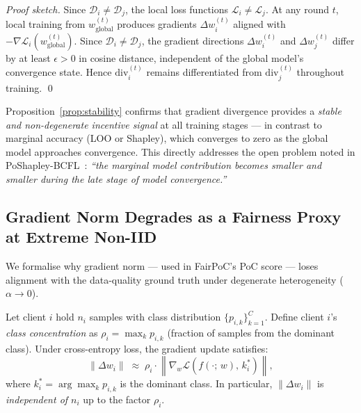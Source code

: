\begin{proof}[Proof sketch]
Since $\mathcal{D}_i \neq \mathcal{D}_j$, the local loss
functions $\mathcal{L}_i \neq \mathcal{L}_j$.
At any round $t$, local training from $w_{\mathrm{global}}^{(t)}$
produces gradients $\Delta w_i^{(t)}$ aligned with
$-\nabla \mathcal{L}_i(w_{\mathrm{global}}^{(t)})$.
Since $\mathcal{D}_i \neq \mathcal{D}_j$, the gradient directions
$\Delta w_i^{(t)}$ and $\Delta w_j^{(t)}$ differ by at least
$\epsilon > 0$ in cosine distance, independent of the global model's
convergence state.
Hence $\mathrm{div}_i^{(t)}$ remains differentiated from
$\mathrm{div}_j^{(t)}$ throughout training. \qed
\end{proof}

\begin{remark}
Proposition~\ref{prop:stability} confirms that gradient divergence
provides a \emph{stable and non-degenerate incentive signal}
at all training stages — in contrast to marginal accuracy
(LOO or Shapley), which converges to zero as the global model
approaches convergence.
This directly addresses the open problem noted in
PoShapley-BCFL~\cite{poshapley2023}: \emph{``the marginal model
contribution becomes smaller and smaller during the late stage
of model convergence.''}
\end{remark}

\subsection{Gradient Norm Degrades as a Fairness Proxy at Extreme Non-IID}

We formalise why gradient norm — used in FairPoC's PoC score —
loses alignment with the data-quality ground truth under
degenerate heterogeneity ($\alpha \to 0$).

\begin{proposition}
\label{prop:gradnorm_limit}
Let client $i$ hold $n_i$ samples with class distribution
$\{p_{i,k}\}_{k=1}^{C}$.
Define client $i$'s \emph{class concentration} as
$\rho_i = \max_k p_{i,k}$ (fraction of samples from the dominant class).
Under cross-entropy loss, the gradient update satisfies:
\begin{equation}
  \|\Delta w_i\| \;\approx\;
  \rho_i \cdot \left\|\nabla_w \mathcal{L}\!\left(f(\cdot;\,w),\,k_i^*\right)\right\|,
  \label{eq:gradnorm_approx}
\end{equation}
where $k_i^* = \arg\max_k p_{i,k}$ is the dominant class.
In particular, $\|\Delta w_i\|$ is \emph{independent of $n_i$} up to
the factor $\rho_i$.
\end{proposition}

